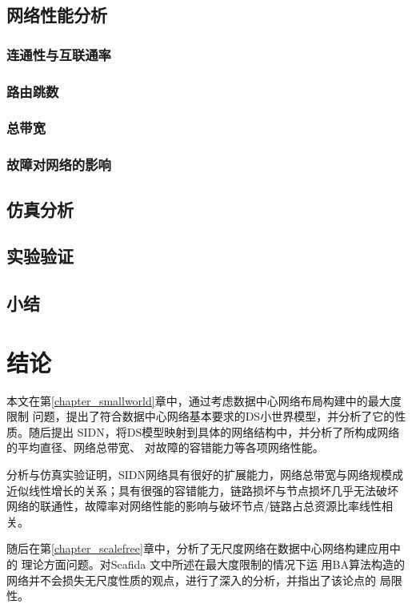 \documentclass[master]{njuthesis}
\begin{document}
\begin{enumerate}
\begin{enumerate}
\begin{enumerate}
\begin{enumerate}
\section{网络性能分析}
\blindtext
\subsection{连通性与互联通率}
\Blindtext
\subsection{路由跳数}
\Blindtext
\subsection{总带宽}
\Blindtext
\subsection{故障对网络的影响}
\Blindtext
\section{仿真分析}
\Blindtext
\section{实验验证}
\Blindtext
\section{小结}
\blindtext
\chapter{结论}\label{chapter_concludes}

本文在第\ref{chapter_smallworld}章中，通过考虑数据中心网络布局构建中的最大度限制
问题，提出了符合数据中心网络基本要求的DS小世界模型，并分析了它的性质。随后提出
SIDN，将DS模型映射到具体的网络结构中，并分析了所构成网络的平均直径、网络总带宽、
对故障的容错能力等各项网络性能。

分析与仿真实验证明，SIDN网络具有很好的扩展能力，网络总带宽与网络规模成
近似线性增长的关系；具有很强的容错能力，链路损坏与节点损坏几乎无法破坏
网络的联通性，故障率对网络性能的影响与破坏节点/链路占总资源比率线性相关。

随后在第\ref{chapter_scalefree}章中，分析了无尺度网络在数据中心网络构建应用中的
理论方面问题。对Scafida \cite{gyarmati2010scafida}文中所述在最大度限制的情况下运
用BA算法构造的网络并不会损失无尺度性质的观点，进行了深入的分析，并指出了该论点的
局限性。


\end{enumerate}
\end{enumerate}
\end{enumerate}
\end{enumerate}
\end{document}
